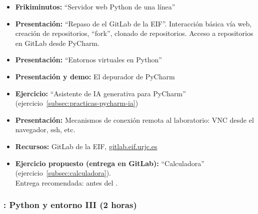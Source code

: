 \documentclass[a4paper,12pt]{article}
\begin{document}
\begin{itemize}
\item \textbf{Frikiminutos:} ``Servidor web Python de una línea''
\item \textbf{Presentación:} ``Repaso de el GitLab de la EIF''. Interacción básica vía web, creación de repositorios, ``fork'', clonado de repositorios. Acceso a repositorios en GitLab desde PyCharm.
\item \textbf{Presentación:} ``Entornos virtuales en Python''
\item \textbf{Presentación y demo:} El depurador de PyCharm
\item \textbf{Ejercicio:} ``Asistente de IA generativa para PyCharm'' (ejercicio~\ref{subsec:practicas-pycharm-ia})
\item \textbf{Presentación:} Mecanismos de conexión remota al laboratorio: VNC desde el navegador, ssh, etc.
\item \textbf{Recursos:} GitLab de la EIF, \url{gitlab.eif.urjc.es}
\item \textbf{Ejercicio propuesto (entrega en GitLab):} ``Calculadora'' (ejercicio~\ref{subsec:calculadora}). \\
  Entrega recomendada: antes del \martesC.
\end{itemize}

\subsubsection{\martesC: Python y entorno III  (2 horas)}
\label{cal:martesC}
\end{document}
